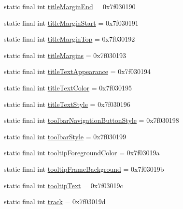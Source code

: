\begin{DoxyCompactItemize}
\item 
static final int \mbox{\hyperlink{classandroid_1_1support_1_1v7_1_1appcompat_1_1_r_1_1attr_ad5c63c69274a686ad0cca3dab4ed6543}{title\+Margin\+End}} = 0x7f030190
\item 
static final int \mbox{\hyperlink{classandroid_1_1support_1_1v7_1_1appcompat_1_1_r_1_1attr_abfe08e41a25653a3a8b8d789b56a092f}{title\+Margin\+Start}} = 0x7f030191
\item 
static final int \mbox{\hyperlink{classandroid_1_1support_1_1v7_1_1appcompat_1_1_r_1_1attr_aa93444276547b6992aaafc06f0318594}{title\+Margin\+Top}} = 0x7f030192
\item 
static final int \mbox{\hyperlink{classandroid_1_1support_1_1v7_1_1appcompat_1_1_r_1_1attr_af20050b093f0fbae9f5caeac8e1f5a5e}{title\+Margins}} = 0x7f030193
\item 
static final int \mbox{\hyperlink{classandroid_1_1support_1_1v7_1_1appcompat_1_1_r_1_1attr_af30268dd35d59987ae331965f3e4b27f}{title\+Text\+Appearance}} = 0x7f030194
\item 
static final int \mbox{\hyperlink{classandroid_1_1support_1_1v7_1_1appcompat_1_1_r_1_1attr_af7f5689d219b8641d6c75b7701d5966e}{title\+Text\+Color}} = 0x7f030195
\item 
static final int \mbox{\hyperlink{classandroid_1_1support_1_1v7_1_1appcompat_1_1_r_1_1attr_ade279724823bddd614405995b4faf136}{title\+Text\+Style}} = 0x7f030196
\item 
static final int \mbox{\hyperlink{classandroid_1_1support_1_1v7_1_1appcompat_1_1_r_1_1attr_a47d1ceaaf7373d5f8472dfffbeec86b7}{toolbar\+Navigation\+Button\+Style}} = 0x7f030198
\item 
static final int \mbox{\hyperlink{classandroid_1_1support_1_1v7_1_1appcompat_1_1_r_1_1attr_a06381c6ce2a53989bf4629cd4d250d3a}{toolbar\+Style}} = 0x7f030199
\item 
static final int \mbox{\hyperlink{classandroid_1_1support_1_1v7_1_1appcompat_1_1_r_1_1attr_ac0f3eee2a0c876e03b40cbde51a9a728}{tooltip\+Foreground\+Color}} = 0x7f03019a
\item 
static final int \mbox{\hyperlink{classandroid_1_1support_1_1v7_1_1appcompat_1_1_r_1_1attr_ab06eb6f844f0d30989f01fed152749df}{tooltip\+Frame\+Background}} = 0x7f03019b
\item 
static final int \mbox{\hyperlink{classandroid_1_1support_1_1v7_1_1appcompat_1_1_r_1_1attr_a19ea8abe4cfe04fbdbb0d642bc045ce6}{tooltip\+Text}} = 0x7f03019c
\item 
static final int \mbox{\hyperlink{classandroid_1_1support_1_1v7_1_1appcompat_1_1_r_1_1attr_accde29fd93475195158a6087ebeb2bb1}{track}} = 0x7f03019d

\end{DoxyCompactItemize}
